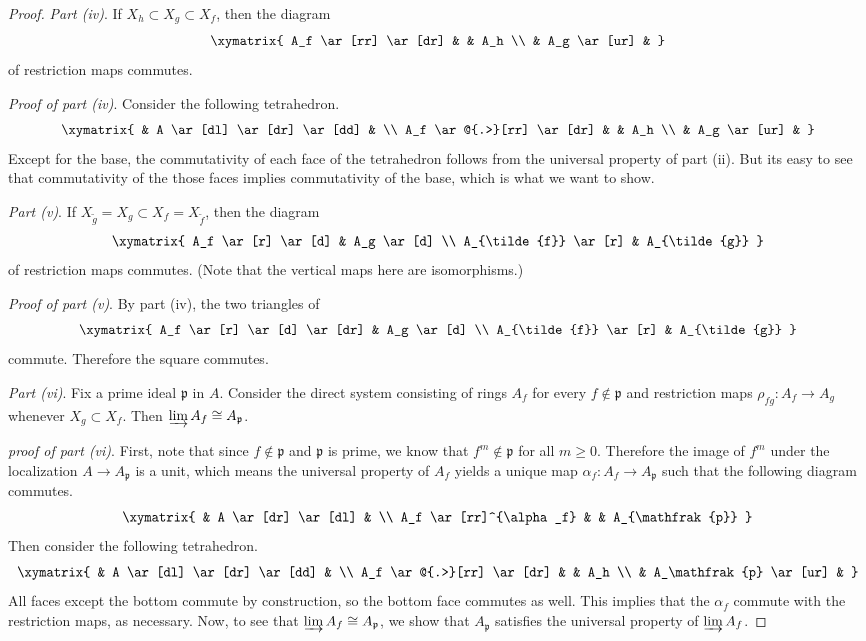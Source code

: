 \begin{proof}
\emph{Part (iv)}.
If $ X_h \subset X_g \subset X_f$, then the diagram
\[ \xymatrix{
A_f \ar[rr] \ar[dr] & & A_h \\
& A_g \ar[ur] &
} \]
of restriction maps commutes.

\emph{Proof of part (iv)}.
Consider the following tetrahedron.
\[ \xymatrix{
& A \ar[dl] \ar[dr] \ar[dd] & \\
A_f \ar@{.>}[rr] \ar[dr] & & A_h \\
& A_g \ar[ur] &
} \]
Except for the base, the commutativity of each face of the
tetrahedron follows from the universal property of part (ii).
But its easy to see that commutativity of the those faces
implies commutativity of the base, which is what we want to
show.

\emph{Part (v)}.
If $ X_{\tilde{g}} = X_g \subset X_f = X_{\tilde{f}}$, then
the diagram
\[ \xymatrix{
A_f \ar[r] \ar[d] & A_g \ar[d] \\
A_{\tilde{f}} \ar[r] & A_{\tilde{g}}
} \]
of restriction maps commutes. (Note that the vertical maps here
are isomorphisms.)

\emph{Proof of part (v)}.
By part (iv), the two triangles of
\[ \xymatrix{
A_f \ar[r] \ar[d] \ar[dr] & A_g \ar[d] \\
A_{\tilde{f}} \ar[r] & A_{\tilde{g}}
} \]
commute. Therefore the square commutes.

\emph{Part (vi)}.
Fix a prime ideal $ \mathfrak{p}$ in $ A$. Consider the direct
system consisting of rings $ A_f$ for every $ f \notin
\mathfrak{p}$ and restriction maps $ \rho_{fg} : A_f \to A_g$
whenever $ X_g \subset X_f$. Then $ \varinjlim A_f \cong
A_{\mathfrak{p}}$.

\emph{proof of part (vi)}.
First, note that since $ f \notin \mathfrak{p}$ and $
\mathfrak{p}$ is prime, we know that $ f^m \notin \mathfrak{p}$
for all $ m \geq 0$. Therefore the image of $ f^m$ under the
localization $ A \to A_\mathfrak{p}$ is a unit, which means the
universal property of $ A_f$ yields a unique map $ \alpha_f :
A_f \to A_\mathfrak{p}$ such that the following diagram
commutes.
\[ \xymatrix{
& A \ar[dr] \ar[dl] & \\
A_f \ar[rr]^{\alpha_f} & & A_{\mathfrak{p}}
} \]
Then consider the following tetrahedron.
\[ \xymatrix{
& A \ar[dl] \ar[dr] \ar[dd] & \\
A_f \ar@{.>}[rr] \ar[dr] & & A_h \\
& A_\mathfrak{p} \ar[ur] &
} \]
All faces except the bottom commute by construction, so the
bottom face commutes as well. This implies that the $ \alpha_f$
commute with the restriction maps, as necessary. Now, to see
that $ \varinjlim A_f \cong A_\mathfrak{p}$, we show that $
A_\mathfrak{p}$ satisfies the universal property of $ \varinjlim
A_f$.


\end{proof}
